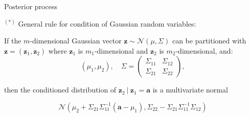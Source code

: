 \documentclass[11pt,compress,t,notes=noshow, xcolor=table]{beamer}
\begin{document}
\begin{vbframe}{Posterior process}
\framebreak 

$^{(*)}$ General rule for condition of Gaussian random variables: 

\lz 

  If the $m$-dimensional Gaussian vector $\bm{z} \sim \mathcal{N}(\mu, \Sigma)$ can be partitioned with $\bm{z} = \left(\bm{z}_1, \bm{z}_2\right)$ where $\bm{z}_1$ is $m_1$-dimensional and $\bm{z}_2$ is $m_2$-dimensional, and:
$$\left(\mu_1, \mu_2\right), \quad \Sigma = \begin{pmatrix} \Sigma_{11} & \Sigma_{12} \\ \Sigma_{21} & \Sigma_{22} \end{pmatrix},$$

then the conditioned distribution of $\bm{z}_2 ~|~ \bm{z}_1 = \bm{a}$ is a multivariate normal  

$$
  \mathcal{N}\left(\mu_2 + \Sigma_{21} \Sigma_{11}^{-1}\left(\bm{a} - \mu_1\right), \Sigma_{22} - \Sigma_{21}\Sigma_{11}^{-1}\Sigma_{12} \right)
$$

\end{vbframe} 
\end{document}
